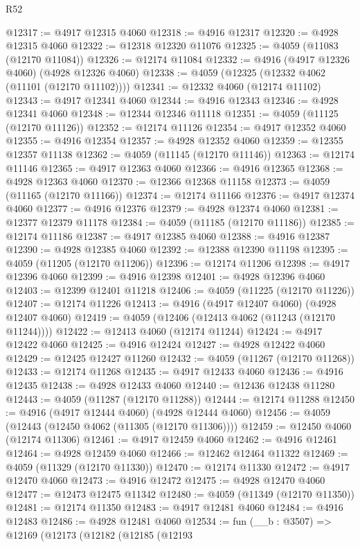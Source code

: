 \begin{lexlean}{R52}
\begin{coremodule}
@12317 := @4917 @12315 @4060
@12318 := @4916 @12317
@12320 := @4928 @12315 @4060
@12322 := @12318 @12320 @11076
@12325 := @4059 (@11083 (@12170 @11084))
@12326 := @12174 @11084
@12332 := @4916 (@4917 @12326 @4060) (@4928 @12326 @4060)
@12338 := @4059 (@12325 (@12332 @4062 (@11101 (@12170 @11102))))
@12341 := @12332 @4060 (@12174 @11102)
@12343 := @4917 @12341 @4060
@12344 := @4916 @12343
@12346 := @4928 @12341 @4060
@12348 := @12344 @12346 @11118
@12351 := @4059 (@11125 (@12170 @11126))
@12352 := @12174 @11126
@12354 := @4917 @12352 @4060
@12355 := @4916 @12354
@12357 := @4928 @12352 @4060
@12359 := @12355 @12357 @11138
@12362 := @4059 (@11145 (@12170 @11146))
@12363 := @12174 @11146
@12365 := @4917 @12363 @4060
@12366 := @4916 @12365
@12368 := @4928 @12363 @4060
@12370 := @12366 @12368 @11158
@12373 := @4059 (@11165 (@12170 @11166))
@12374 := @12174 @11166
@12376 := @4917 @12374 @4060
@12377 := @4916 @12376
@12379 := @4928 @12374 @4060
@12381 := @12377 @12379 @11178
@12384 := @4059 (@11185 (@12170 @11186))
@12385 := @12174 @11186
@12387 := @4917 @12385 @4060
@12388 := @4916 @12387
@12390 := @4928 @12385 @4060
@12392 := @12388 @12390 @11198
@12395 := @4059 (@11205 (@12170 @11206))
@12396 := @12174 @11206
@12398 := @4917 @12396 @4060
@12399 := @4916 @12398
@12401 := @4928 @12396 @4060
@12403 := @12399 @12401 @11218
@12406 := @4059 (@11225 (@12170 @11226))
@12407 := @12174 @11226
@12413 := @4916 (@4917 @12407 @4060) (@4928 @12407 @4060)
@12419 := @4059 (@12406 (@12413 @4062 (@11243 (@12170 @11244))))
@12422 := @12413 @4060 (@12174 @11244)
@12424 := @4917 @12422 @4060
@12425 := @4916 @12424
@12427 := @4928 @12422 @4060
@12429 := @12425 @12427 @11260
@12432 := @4059 (@11267 (@12170 @11268))
@12433 := @12174 @11268
@12435 := @4917 @12433 @4060
@12436 := @4916 @12435
@12438 := @4928 @12433 @4060
@12440 := @12436 @12438 @11280
@12443 := @4059 (@11287 (@12170 @11288))
@12444 := @12174 @11288
@12450 := @4916 (@4917 @12444 @4060) (@4928 @12444 @4060)
@12456 := @4059 (@12443 (@12450 @4062 (@11305 (@12170 @11306))))
@12459 := @12450 @4060 (@12174 @11306)
@12461 := @4917 @12459 @4060
@12462 := @4916 @12461
@12464 := @4928 @12459 @4060
@12466 := @12462 @12464 @11322
@12469 := @4059 (@11329 (@12170 @11330))
@12470 := @12174 @11330
@12472 := @4917 @12470 @4060
@12473 := @4916 @12472
@12475 := @4928 @12470 @4060
@12477 := @12473 @12475 @11342
@12480 := @4059 (@11349 (@12170 @11350))
@12481 := @12174 @11350
@12483 := @4917 @12481 @4060
@12484 := @4916 @12483
@12486 := @4928 @12481 @4060
@12534 := fun (__b : @3507) =>
  @12169
    (@12173
      (@12182
        (@12185
          (@12193

\end{coremodule}
\end{lexlean}
